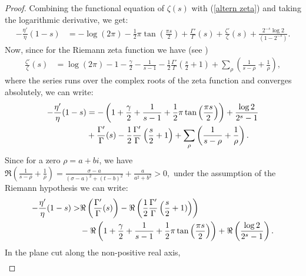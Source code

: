 \documentclass{amsart}
\theoremstyle{plain}
\theoremstyle{definition}
\newcommand{\checkme}[1]{{\color{blue}CHECKME: #1}}
\begin{document}
\begin{proof}
Combining the functional equation of \(\zeta(s)\) with (\ref{altern zeta}) and 
taking the logarithmic derivative, we get:
    \begin{align}
        -\frac{\eta'}{\eta}(1-s)&= -\log(2\pi) -\frac{1}{2}\pi \tan\left(\frac{\pi s}{2}\right) + \frac{\Gamma'}{\Gamma}(s)+\frac{\zeta'}{\zeta}(s)+\frac{2^{-s}\log 2}{(1-2^{-s})}.   \label{logarithmic eta}
    \end{align}
    Now, since for the Riemann zeta function we have (see \cite[(2.12.7)]{titchmarsh1986theory})
    \begin{align}
        \frac{\zeta'}{\zeta}(s)&= \log(2\pi)-1-\frac{\gamma}{2}- \frac{1}{s-1}-
        \frac{1}{2}\frac{\Gamma'}{\Gamma}\left(\frac{s}{2}+1\right)+\sum_{\rho}\left(\frac{1}{s-\rho}+\frac{1}{\rho}\right),
    \end{align}
    where the series runs over the complex roots of the zeta function and converges absolutely, we can write: 
    \begin{align}
        -\frac{\eta'}{\eta}(1-s)&=-\left(1+\frac{\gamma}{2}+\frac{1}{s-1}+\frac{1}{2}\pi \tan\left(\frac{\pi s}{2}\right)\right) +\frac{\log 2}{2^s-1}\notag\\
        &+ \frac{\Gamma'}{\Gamma}(s)-\frac{1}{2}\frac{\Gamma'}{\Gamma}\left(\frac{s}{2}+1\right)+\sum_{\rho}\left(\frac{1}{s-\rho}+\frac{1}{\rho}\right).
        \label{logarithmic eta long}
    \end{align}
    Since for a zero $\rho = a + bi$, we have
    \(
        \Re\left(\frac{1}{s-\rho}+\frac{1}{\rho}\right)=\frac{\sigma-a}{(\sigma-a)^2+(t-b)^2}+\frac{a}{a^2+b^2}>0,
    \)
    under the assumption of the Riemann hypothesis we can write: 
    \begin{align}\label{eta log total}
        -\frac{\eta'}{\eta}(1-s) >& \Re\left(\frac{\Gamma'}{\Gamma}(s)\right)-\Re\left(\frac{1}{2}\frac{\Gamma'}{\Gamma}\left(\frac{s}{2}+1)\right)\right)\notag\\
        &-\Re\left(1+\frac{\gamma}{2}+\frac{1}{s-1}+\frac{1}{2}\pi \tan\left(\frac{\pi s}{2}\right)\right) +\Re\left(\frac{\log 2}{2^s-1}\right).
    \end{align}
    In the plane cut along the non-positive real axis,
    \begin{align*}

\end{align*}
\end{proof}
\end{document}
